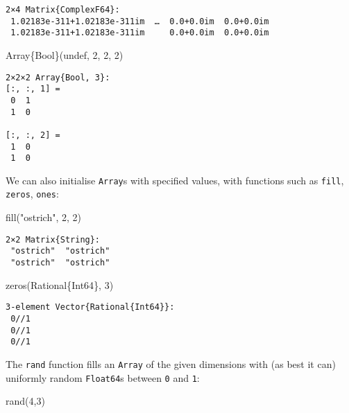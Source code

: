 \documentclass[
  letterpaper,
  DIV=11,
  numbers=noendperiod]{scrreprt}
\newenvironment{Shaded}{\begin{snugshade}}{\end{snugshade}}
\newcommand{\ConstantTok}[1]{\textcolor[rgb]{0.56,0.35,0.01}{#1}}
\newcommand{\DataTypeTok}[1]{\textcolor[rgb]{0.68,0.00,0.00}{#1}}
\newcommand{\FloatTok}[1]{\textcolor[rgb]{0.68,0.00,0.00}{#1}}
\newcommand{\FunctionTok}[1]{\textcolor[rgb]{0.28,0.35,0.67}{#1}}
\newcommand{\NormalTok}[1]{\textcolor[rgb]{0.00,0.23,0.31}{#1}}
\newcommand{\StringTok}[1]{\textcolor[rgb]{0.13,0.47,0.30}{#1}}
\begin{document}
\begin{verbatim}
2×4 Matrix{ComplexF64}:
 1.02183e-311+1.02183e-311im  …  0.0+0.0im  0.0+0.0im
 1.02183e-311+1.02183e-311im     0.0+0.0im  0.0+0.0im
\end{verbatim}

\begin{Shaded}
\begin{Highlighting}[]
\FunctionTok{Array}\DataTypeTok{\{Bool\}}\NormalTok{(}\ConstantTok{undef}\NormalTok{, }\FloatTok{2}\NormalTok{, }\FloatTok{2}\NormalTok{, }\FloatTok{2}\NormalTok{)}
\end{Highlighting}
\end{Shaded}

\begin{verbatim}
2×2×2 Array{Bool, 3}:
[:, :, 1] =
 0  1
 1  0

[:, :, 2] =
 1  0
 1  0
\end{verbatim}

We can also initialise \texttt{Array}s with specified values, with
functions such as \texttt{fill}, \texttt{zeros}, \texttt{ones}:

\begin{Shaded}
\begin{Highlighting}[]
\FunctionTok{fill}\NormalTok{(}\StringTok{"ostrich"}\NormalTok{, }\FloatTok{2}\NormalTok{, }\FloatTok{2}\NormalTok{)}
\end{Highlighting}
\end{Shaded}

\begin{verbatim}
2×2 Matrix{String}:
 "ostrich"  "ostrich"
 "ostrich"  "ostrich"
\end{verbatim}

\begin{Shaded}
\begin{Highlighting}[]
\FunctionTok{zeros}\NormalTok{(}\DataTypeTok{Rational}\NormalTok{\{}\DataTypeTok{Int64}\NormalTok{\}, }\FloatTok{3}\NormalTok{)}
\end{Highlighting}
\end{Shaded}

\begin{verbatim}
3-element Vector{Rational{Int64}}:
 0//1
 0//1
 0//1
\end{verbatim}

The \texttt{rand} function fills an \texttt{Array} of the given
dimensions with (as best it can) uniformly random \texttt{Float64}s
between \texttt{0} and \texttt{1}:

\begin{Shaded}
\begin{Highlighting}[]
\FunctionTok{rand}\NormalTok{(}\FloatTok{4}\NormalTok{,}\FloatTok{3}\NormalTok{)}
\end{Highlighting}
\end{Shaded}
\end{document}
